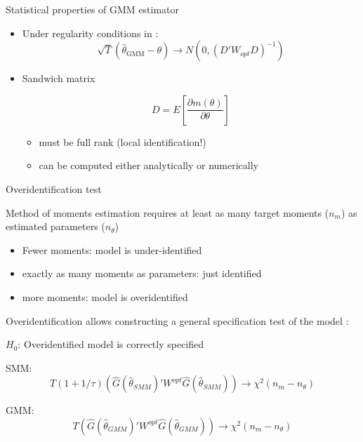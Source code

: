\begin{frame}{Statistical properties of GMM estimator}
  \begin{itemize}
    \item Under regularity conditions in \textcite{Hansen1982}:
          \begin{equation}
            \sqrt{T} (\hat{\theta}_{\text{GMM}} - \theta) \rightarrow N \left(0, (D'W_{opt}D)^{-1} \right)
          \end{equation}
    \item Sandwich matrix

          \begin{equation}
            D = E \left[ \frac{\partial m(\theta)}{\partial \theta} \right]
          \end{equation}

          \begin{itemize}
            \item must be full rank (local identification!)
            \item can be computed either analytically or numerically
          \end{itemize}
  \end{itemize}
\end{frame}


\begin{frame}{Overidentification test}
  \begin{witemize}
    \item Method of moments estimation requires at least as many target moments ($n_m$) as estimated parameters ($n_\theta$)
    \begin{itemize}
      \item Fewer moments: model is under-identified
      \item exactly as many moments as parameters: just identified
      \item more moments: model is overidentified
    \end{itemize}
    \item Overidentification allows constructing a general specification test of the model \parencite{Hansen1982}:
    \item $H_0$: Overidentified model is correctly specified
    \item SMM:
    \begin{equation}
      T(1 + 1/\tau) (\hat{G}(\hat{\theta}_{SMM})'W^{opt}\hat{G}(\hat{\theta}_{SMM})) \rightarrow \chi^2(n_m - n_{\theta})
    \end{equation}
    \item GMM:
    \begin{equation}
      T (\hat{G}(\hat{\theta}_{GMM})'W^{opt}\hat{G}(\hat{\theta}_{GMM})) \rightarrow \chi^2(n_m - n_{\theta})
    \end{equation}
  \end{witemize}
\end{frame}

